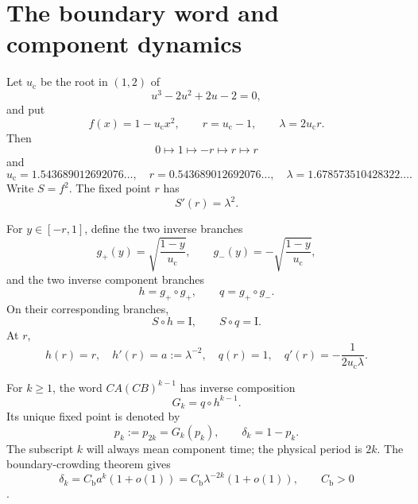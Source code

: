 \documentclass[11pt]{article}
\theoremstyle{definition}
\theoremstyle{remark}
\newcommand{\uc}{u_{\mathrm c}}
\newcommand{\Id}{\mathrm I}
\begin{document}
\section{The boundary word and component dynamics}
\label{sec:setup}

Let $\uc$ be the root in $(1,2)$ of
\begin{equation}\label{eq:cubic}
 u^3-2u^2+2u-2=0,
\end{equation}
and put
\begin{equation}\label{eq:constants}
 f(x)=1-\uc x^2,
 \qquad r=\uc-1,
 \qquad \lambda=2\uc r.
\end{equation}
Then
\begin{equation}\label{eq:critical-orbit}
 0\longmapsto1\longmapsto-r\longmapsto r\longmapsto r
\end{equation}
and
\begin{equation}\label{eq:numerical-constants}
 \uc=1.543689012692076\ldots,
 \quad r=0.543689012692076\ldots,
 \quad \lambda=1.678573510428322\ldots.
\end{equation}
Write $S=f^2$.  The fixed point $r$ has
\begin{equation}\label{eq:S-derivative-r}
 S'(r)=\lambda^2.
\end{equation}

For $y\in[-r,1]$, define the two inverse branches
\begin{equation}\label{eq:inverse-branches}
 g_+(y)=\sqrt{\frac{1-y}{\uc}},
 \qquad
 g_-(y)=-\sqrt{\frac{1-y}{\uc}},
\end{equation}
and the two inverse component branches
\begin{equation}\label{eq:hq}
 h=g_+\circ g_+,
 \qquad q=g_+\circ g_-.
\end{equation}
On their corresponding branches,
\begin{equation}\label{eq:inverse-identities}
 S\circ h=\Id,
 \qquad S\circ q=\Id.
\end{equation}
At $r$,
\begin{equation}\label{eq:hq-data}
 h(r)=r,
 \quad h'(r)=a:=\lambda^{-2},
 \quad q(r)=1,
 \quad q'(r)=-\frac1{2\uc\lambda}.
\end{equation}

For $k\ge1$, the word $CA(CB)^{k-1}$ has inverse composition
\begin{equation}\label{eq:Gk}
 G_k=q\circ h^{k-1}.
\end{equation}
Its unique fixed point is denoted by
\begin{equation}\label{eq:pk-definition}
 p_k:=p_{2k}=G_k(p_k),
 \qquad \delta_k=1-p_k.
\end{equation}
The subscript $k$ will always mean component time; the physical period is
$2k$.  The boundary-crowding theorem gives
\begin{equation}\label{eq:clearance-law}
 \delta_k=C_{\mathrm b}a^k(1+o(1))
 =C_{\mathrm b}\lambda^{-2k}(1+o(1)),
 \qquad C_{\mathrm b}>0
\end{equation}
\citep{WangLongCycle2026,WangEndpointRank2026}.
\end{document}
